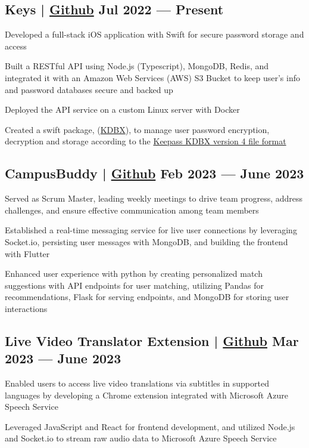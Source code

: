 \subsection{{Keys | \href{https://github.com/jerikjakobsen/keys}{Github} \hfill Jul 2022 --- Present}}
\begin{zitemize}
\item Developed a full-stack iOS application with Swift for secure password storage and access
\item Built a RESTful API using Node.js (Typescript), MongoDB, Redis, and integrated it with an Amazon Web Services (AWS) S3 Bucket to keep user's info and password databases secure and backed up
\item Deployed the API service on a custom Linux server with Docker
\item Created a swift package, (\href{https://github.com/jerikjakobsen/kdbx}{KDBX}), to manage user password encryption, decryption and storage according to the  \href{https://keepass.info/help/kb/kdbx_4.html}{Keepass KDBX version 4 file format}
\end{zitemize}

\subsection{{CampusBuddy | \href{https://github.com/pegliang/CampusBuddy}{Github} \hfill Feb 2023 --- June 2023}}
\begin{zitemize}
\item Served as Scrum Master, leading weekly meetings to drive team progress, address challenges, and ensure effective communication among team members
\item Established a real-time messaging service for live user connections by leveraging Socket.io, persisting user messages with MongoDB, and building the frontend with Flutter
\item Enhanced user experience with python by creating personalized match suggestions with API endpoints for user matching, utilizing Pandas for recommendations, Flask for serving endpoints, and MongoDB for storing user interactions
\end{zitemize}

\subsection{{Live Video Translator Extension | \href{https://github.com/jerikjakobsen/Translator-Extension}{Github} \hfill Mar 2023 --- June 2023}}
\begin{zitemize}
\item Enabled users to access live video translations via subtitles in supported languages by developing a Chrome extension integrated with Microsoft Azure Speech Service
\item Leveraged JavaScript and React for frontend development, and utilized Node.js and Socket.io to stream raw audio data to Microsoft Azure Speech Service
\end{zitemize}

